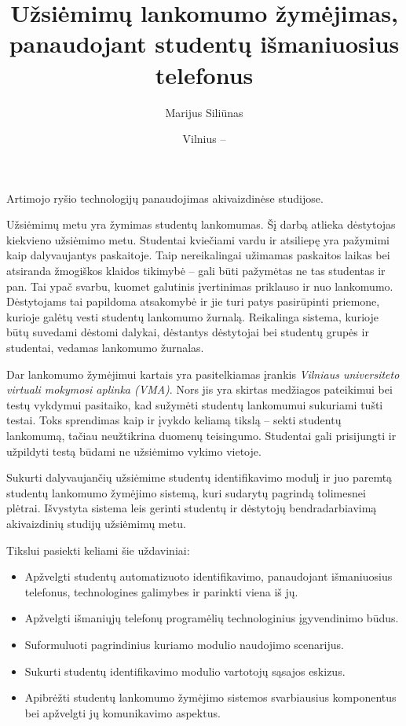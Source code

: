 \documentclass{VUMIFPSkursinis}
\title{Užsiėmimų lankomumo žymėjimas, panaudojant studentų išmaniuosius telefonus}
\author{Marijus Siliūnas}
\date{Vilnius – \the\year}
\begin{document}
\maketitle



\tableofcontents



Artimojo ryšio technologijų panaudojimas akivaizdinėse studijose.


Užsiėmimų metu yra žymimas studentų lankomumas. Šį darbą atlieka dėstytojas kiekvieno užsiėmimo metu. Studentai kviečiami vardu ir atsiliepę yra pažymimi kaip dalyvaujantys paskaitoje. Taip nereikalingai užimamas paskaitos laikas bei atsiranda žmogiškos klaidos tikimybė – gali būti pažymėtas ne tas studentas ir pan. Tai ypač svarbu, kuomet galutinis įvertinimas priklauso ir nuo lankomumo. Dėstytojams tai papildoma atsakomybė ir jie turi patys pasirūpinti priemone, kurioje galėtų vesti studentų lankomumo žurnalą. Reikalinga sistema, kurioje būtų suvedami dėstomi dalykai, dėstantys dėstytojai bei studentų grupės ir studentai, vedamas lankomumo žurnalas.

Dar lankomumo žymėjimui kartais yra pasitelkiamas įrankis \textit{Vilniaus universiteto virtuali mokymosi aplinka (VMA)}. Nors jis yra skirtas medžiagos pateikimui bei testų vykdymui pasitaiko, kad sužymėti studentų lankomumui sukuriami tušti testai. Toks sprendimas kaip ir įvykdo keliamą tikslą – sekti studentų lankomumą, tačiau neužtikrina duomenų teisingumo. Studentai gali prisijungti ir užpildyti testą būdami ne užsiėmimo vykimo vietoje.


Sukurti dalyvaujančių užsiėmime studentų identifikavimo modulį ir juo paremtą studentų lankomumo žymėjimo sistemą, kuri sudarytų pagrindą tolimesnei plėtrai. Išvystyta sistema leis gerinti studentų ir dėstytojų bendradarbiavimą akivaizdinių studijų užsiėmimų metu.


Tikslui pasiekti keliami šie uždaviniai:

\begin{itemize}
	\item Apžvelgti studentų automatizuoto identifikavimo, panaudojant išmaniuosius telefonus, technologines galimybes ir parinkti viena iš jų.
	\item Apžvelgti išmaniųjų telefonų programėlių technologinius įgyvendinimo būdus.
	\item Suformuluoti pagrindinius kuriamo modulio naudojimo scenarijus.
	\item Sukurti studentų identifikavimo modulio vartotojų sąsajos eskizus.
	\item Apibrėžti studentų lankomumo žymėjimo sistemos svarbiausius komponentus bei apžvelgti jų komunikavimo aspektus.
\end{itemize}
\end{document}
